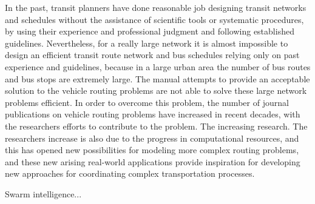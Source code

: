 In the past, transit planners have done reasonable job designing transit networks and schedules without the assistance of scientific tools or systematic procedures, by using their experience and professional judgment and following established  guidelines. Nevertheless, for a really large network it is almost impossible to design an efficient transit route network and bus schedules relying only on past experience and guidelines, because in a large urban area the number of bus routes and bus stops are extremely large. The manual attempts to provide an acceptable solution to the vehicle routing problems are not able to solve these large network problems efficient. In order to overcome this problem, the number of journal publications on vehicle routing problems have increased in recent decades, with the researchers efforts to contribute to the problem. The increasing research. The researchers increase is also due to the progress in computational resources, and this has opened new possibilities for modeling more complex routing problems, and these new arising real-world applications provide inspiration for developing new approaches for coordinating complex transportation processes. 

Swarm intelligence...






